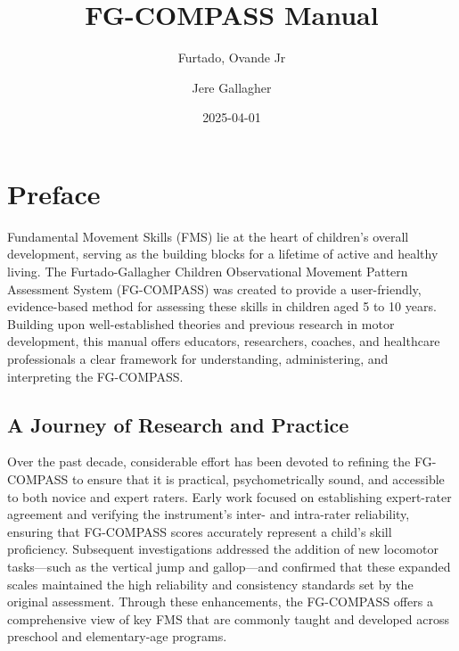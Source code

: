 \documentclass[
  letterpaper,
  DIV=11,
  numbers=noendperiod]{scrreprt}
\title{FG-COMPASS Manual}
\author{Furtado, Ovande Jr \and Jere Gallagher}
\date{2025-04-01}
\renewcommand*\contentsname{Table of contents}
\newcommand\contentsname{Table of contents}
\begin{document}
\maketitle

\renewcommand*\contentsname{Table of contents}
{
\hypersetup{linkcolor=}
\setcounter{tocdepth}{2}
\tableofcontents
}


\chapter*{Preface}\label{preface}


Fundamental Movement Skills (FMS) lie at the heart of children's overall
development, serving as the building blocks for a lifetime of active and
healthy living. The Furtado-Gallagher Children Observational Movement
Pattern Assessment System (FG-COMPASS) was created to provide a
user-friendly, evidence-based method for assessing these skills in
children aged 5 to 10 years. Building upon well-established theories and
previous research in motor development, this manual offers educators,
researchers, coaches, and healthcare professionals a clear framework for
understanding, administering, and interpreting the FG-COMPASS.

\section*{A Journey of Research and
Practice}\label{a-journey-of-research-and-practice}


Over the past decade, considerable effort has been devoted to refining
the FG-COMPASS to ensure that it is practical, psychometrically sound,
and accessible to both novice and expert raters. Early work focused on
establishing expert-rater agreement and verifying the instrument's
inter- and intra-rater reliability, ensuring that FG-COMPASS scores
accurately represent a child's skill proficiency. Subsequent
investigations addressed the addition of new locomotor tasks---such as
the vertical jump and gallop---and confirmed that these expanded scales
maintained the high reliability and consistency standards set by the
original assessment. Through these enhancements, the FG-COMPASS offers a
comprehensive view of key FMS that are commonly taught and developed
across preschool and elementary-age programs.
\end{document}

